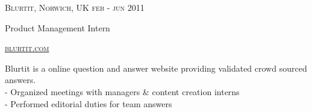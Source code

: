 {
  \textsc{\small{Blurtit, Norwich, UK
    \hfill
      {\raggedleft
        feb - jun 2011
      } \\
    }
  }
  {\raggedright\large {
    Product Management Intern
  } \\}

  \textsc{\small\href{http://www.blurtit.com}{blurtit.com}}

  \normalsize{
    Blurtit is a online question and answer website providing validated crowd sourced answers. \\
    - Organized meetings with managers \& content creation interns\\
    - Performed editorial duties for team answers
  }
}
